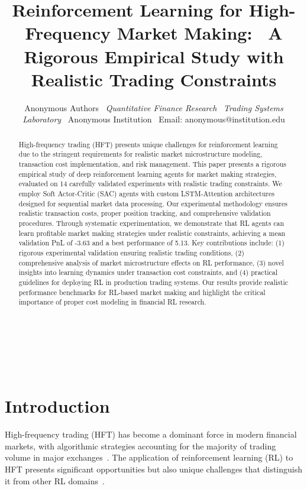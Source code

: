 \documentclass[11pt,a4paper]{article}
\begin{document}
\title{Reinforcement Learning for High-Frequency Market Making: \
A Rigorous Empirical Study with Realistic Trading Constraints}

\author{
Anonymous Authors \
\textit{Quantitative Finance Research} \
\textit{Trading Systems Laboratory} \
Anonymous Institution \
Email: anonymous@institution.edu
}

\maketitle
\
\

\begin{abstract}
High-frequency trading (HFT) presents unique challenges for reinforcement learning due to the stringent requirements for realistic market microstructure modeling, transaction cost implementation, and risk management. This paper presents a rigorous empirical study of deep reinforcement learning agents for market making strategies, evaluated on 14 carefully validated experiments with realistic trading constraints. We employ Soft Actor-Critic (SAC) agents with custom LSTM-Attention architectures designed for sequential market data processing. Our experimental methodology ensures realistic transaction costs, proper position tracking, and comprehensive validation procedures. Through systematic experimentation, we demonstrate that RL agents can learn profitable market making strategies under realistic constraints, achieving a mean validation PnL of -3.63 and a best performance of 5.13. Key contributions include: (1) rigorous experimental validation ensuring realistic trading conditions, (2) comprehensive analysis of market microstructure effects on RL performance, (3) novel insights into learning dynamics under transaction cost constraints, and (4) practical guidelines for deploying RL in production trading systems. Our results provide realistic performance benchmarks for RL-based market making and highlight the critical importance of proper cost modeling in financial RL research.
\end{abstract}
\
\

\section{Introduction}

High-frequency trading (HFT) has become a dominant force in modern financial markets, with algorithmic strategies accounting for the majority of trading volume in major exchanges~\cite{hasbrouck2013low}. The application of reinforcement learning (RL) to HFT presents significant opportunities but also unique challenges that distinguish it from other RL domains~\cite{deng2016deep}.
\end{document}
